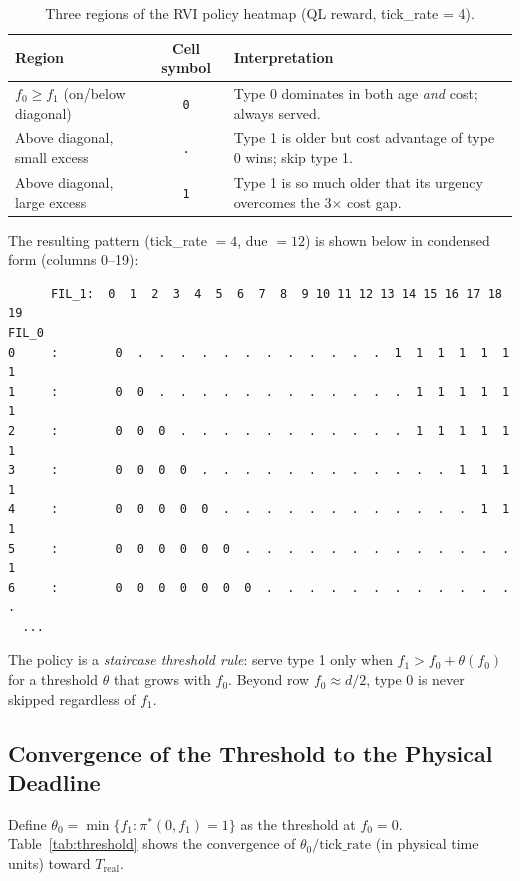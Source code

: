 \documentclass[11pt,a4paper]{article}
\begin{document}
\begin{table}[h]
\centering
\caption{Three regions of the RVI policy heatmap (QL reward, tick\_rate = 4).}
\label{tab:regions}
\begin{tabular}{lcl}
\toprule
Region & Cell symbol & Interpretation \\
\midrule
$f_0 \geq f_1$ (on/below diagonal) & \texttt{0}
  & Type 0 dominates in both age \emph{and} cost; always served. \\
Above diagonal, small excess & \texttt{.}
  & Type 1 is older but cost advantage of type 0 wins; skip type 1. \\
Above diagonal, large excess & \texttt{1}
  & Type 1 is so much older that its urgency overcomes the 3$\times$ cost gap. \\
\bottomrule
\end{tabular}
\end{table}

The resulting pattern (tick\_rate $= 4$, due $= 12$) is shown below in
condensed form (columns 0--19):

\begin{verbatim}
      FIL_1:  0  1  2  3  4  5  6  7  8  9 10 11 12 13 14 15 16 17 18 19
FIL_0
0     :        0  .  .  .  .  .  .  .  .  .  .  .  .  1  1  1  1  1  1  1
1     :        0  0  .  .  .  .  .  .  .  .  .  .  .  .  1  1  1  1  1  1
2     :        0  0  0  .  .  .  .  .  .  .  .  .  .  .  1  1  1  1  1  1
3     :        0  0  0  0  .  .  .  .  .  .  .  .  .  .  .  .  1  1  1  1
4     :        0  0  0  0  0  .  .  .  .  .  .  .  .  .  .  .  .  1  1  1
5     :        0  0  0  0  0  0  .  .  .  .  .  .  .  .  .  .  .  .  .  1
6     :        0  0  0  0  0  0  0  .  .  .  .  .  .  .  .  .  .  .  .  .
  ...
\end{verbatim}

The policy is a \emph{staircase threshold rule}: serve type 1 only when
$f_1 > f_0 + \theta(f_0)$ for a threshold $\theta$ that grows with $f_0$.
Beyond row $f_0 \approx d/2$, type 0 is never skipped regardless of $f_1$.

\subsection{Convergence of the Threshold to the Physical Deadline}

Define $\theta_0 = \min\{f_1 : \pi^*(0, f_1) = 1\}$ as the threshold at
$f_0 = 0$.  Table~\ref{tab:threshold} shows the convergence of
$\theta_0 / \text{tick\_rate}$ (in physical time units) toward $T_\text{real}$.
\end{document}
